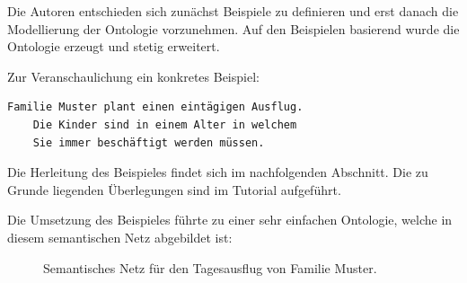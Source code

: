 Die Autoren entschieden sich zunächst Beispiele zu definieren und erst danach die Modellierung der Ontologie vorzunehmen. Auf den Beispielen basierend wurde die Ontologie erzeugt und stetig erweitert. 

Zur Veranschaulichung ein konkretes Beispiel:

\begin{lstlisting}[caption={Konkretes Beispiel einer Reiseplanung.},captionpos=b]
    Familie Muster plant einen eintägigen Ausflug.
    Die Kinder sind in einem Alter in welchem 
    Sie immer beschäftigt werden müssen.
\end{lstlisting}

Die Herleitung des Beispieles findet sich im nachfolgenden Abschnitt. Die zu Grunde liegenden Überlegungen sind im Tutorial aufgeführt.

\newpage

Die Umsetzung des Beispieles führte zu einer sehr einfachen Ontologie, welche in diesem semantischen Netz abgebildet ist:
\begin{figure}[H]
    \centering {}
    \caption{Semantisches Netz für den Tagesausflug von Familie Muster.\label{fig:famMuster}\protect\footnotemark}
\end{figure}

